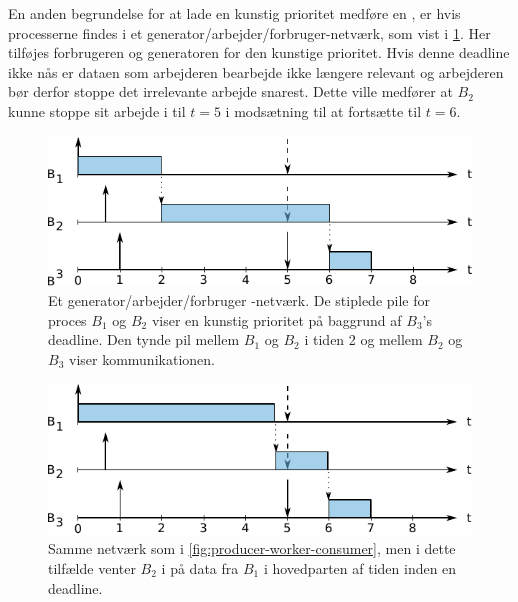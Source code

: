 En anden begrundelse for at lade en kunstig prioritet medføre en , er hvis processerne findes i et generator/arbejder/forbruger-netværk, som vist i \cref{fig:producer-worker-consumer}. Her tilføjes forbrugeren og generatoren for den kunstige prioritet. Hvis denne deadline ikke nås er dataen som arbejderen bearbejde ikke længere relevant og arbejderen bør derfor stoppe det irrelevante arbejde snarest. Dette ville medfører at $B_2$ kunne stoppe sit arbejde i til $t = 5$ i modsætning til at fortsætte til $t = 6$.

\begin{figure}
 \begin{center}
  \includegraphics[scale=1.00]{images/producer-worker-consumer}
  \caption{Et generator/arbejder/forbruger -netværk. De stiplede pile for proces $B_1$ og $B_2$ viser en kunstig prioritet på baggrund af $B_3$'s deadline. Den tynde pil mellem  $B_1$ og $B_2$ i tiden 2 og mellem $B_2$ og $B_3$ viser kommunikationen.}
  \label{fig:producer-worker-consumer}
  \end{center}
\end{figure}

\begin{figure}
 \begin{center}
  \includegraphics[scale=1.00]{images/producer-worker-consumer2}
  \caption{Samme netværk som i \autoref{fig:producer-worker-consumer}, men i dette tilfælde venter $B_2$ i på data fra $B_1$ i hovedparten af tiden inden en deadline.}
  \label{fig:producer-worker-consumer2}
  \end{center}
\end{figure}


